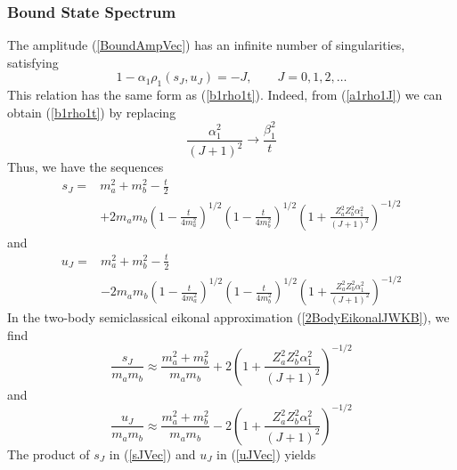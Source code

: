 \subsubsection{Bound State Spectrum}
The amplitude (\ref{BoundAmpVec}) has an infinite number of singularities, satisfying
\begin{equation}
	1 - \alpha_{1} \rho_{1}(s_{J}, u_{J}) = - J, \qquad J = 0, 1, 2, \ldots \label{a1rho1J}
\end{equation}
This relation has the same form as (\ref{b1rho1t}). Indeed, from (\ref{a1rho1J}) we can obtain (\ref{b1rho1t}) by replacing
\begin{equation}
	\frac{\alpha_{1}^{2}}{(J+1)^{2}} \longrightarrow \frac{\beta_{1}^{2}}{t}
\end{equation}
Thus, we have the sequences
\begin{equation}
\begin{split}
	s_{J} = {}& m_{a}^{2} + m_{b}^{2} - \frac{t}{2} \\
	&+ 2 m_{a} m_{b} \left(1 - \frac{t}{4m_{a}^{2}} \right)^{1/2} \left(1 - \frac{t}{4m_{b}^{2}} \right)^{1/2} \left(1 + \frac{Z_{a}^{2} Z_{b}^{2} \alpha_{1}^{2}}{(J+1)^{2}} \right)^{-1/2}
\end{split} \label{sJtVec}
\end{equation}
and
\begin{equation}
\begin{split}
	u_{J} = {}& m_{a}^{2} + m_{b}^{2} - \frac{t}{2} \\
	&- 2 m_{a} m_{b} \left(1 - \frac{t}{4m_{a}^{2}} \right)^{1/2} \left(1 - \frac{t}{4m_{b}^{2}} \right)^{1/2} \left(1 + \frac{Z_{a}^{2} Z_{b}^{2} \alpha_{1}^{2}}{(J+1)^{2}} \right)^{-1/2}
\end{split} \label{uJtVec}
\end{equation}
In the two-body semiclassical eikonal approximation (\ref{2BodyEikonalJWKB}), we find
\begin{equation}
	\frac{s_{J}}{m_{a} m_{b}} \approx \frac{m_{a}^{2} + m_{b}^{2}}{m_{a} m_{b}} + 2 \left(1 + \frac{Z_{a}^{2} Z_{b}^{2} \alpha_{1}^{2}}{(J+1)^{2}} \right)^{-1/2} \label{sJVec}
\end{equation}
and
\begin{equation}
	\frac{u_{J}}{m_{a} m_{b}} \approx \frac{m_{a}^{2} + m_{b}^{2}}{m_{a} m_{b}} - 2 \left(1 + \frac{Z_{a}^{2} Z_{b}^{2} \alpha_{1}^{2}}{(J+1)^{2}} \right)^{-1/2} \label{uJVec}
\end{equation}
The product of $s_{J}$ in (\ref{sJVec}) and $u_{J}$ in (\ref{uJVec}) yields
